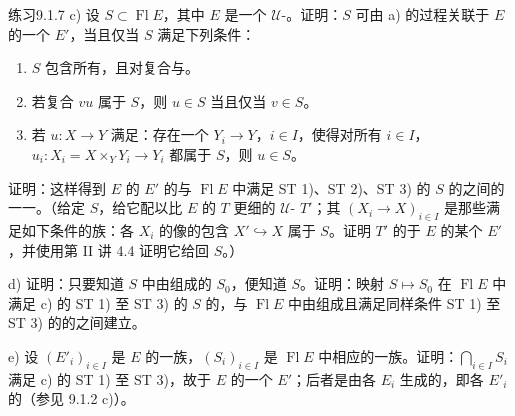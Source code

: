\begin{SGAresult}{练习}{9.1.7}
c) 设 $S\subset\operatorname{Fl}E$，其中 $E$ 是一个 $\mathcal U$-。证明：$S$ 可由 a) 的过程关联于 $E$ 的一个 $E'$，当且仅当 $S$ 满足下列条件：
\begin{enumerate}[label={ST \arabic*)}]
\item $S$ 包含所有，且对复合与。
\item 若复合 $vu$ 属于 $S$，则 $u\in S$ 当且仅当 $v\in S$。
\item 若 $u:X\to Y$ 满足：存在一个 $Y_i\to Y$，$i\in I$，使得对所有 $i\in I$，$u_i:X_i=X\times_Y Y_i\to Y_i$ 都属于 $S$，则 $u\in S$。
\end{enumerate}
证明：这样得到 $E$ 的 $E'$ 的与 $\operatorname{Fl}E$ 中满足 ST 1)、ST 2)、ST 3) 的 $S$ 的之间的一一。（给定 $S$，给它配以比 $E$ 的 $T$ 更细的 $\mathcal U$- $T'$；其 $(X_i\to X)_{i\in I}$ 是那些满足如下条件的族：各 $X_i$ 的像的包含 $X'\hookrightarrow X$ 属于 $S$。证明 $T'$ 的于 $E$ 的某个 $E'$，并使用第 II 讲 4.4 证明它给回 $S$。）

d) 证明：只要知道 $S$ 中由组成的 $S_0$，便知道 $S$。证明：映射 $S\mapsto S_0$ 在 $\operatorname{Fl}E$ 中满足 c) 的 ST 1) 至 ST 3) 的 $S$ 的，与 $\operatorname{Fl}E$ 中由组成且满足同样条件 ST 1) 至 ST 3) 的的之间建立。

e) 设 $(E'_i)_{i\in I}$ 是 $E$ 的一族，$(S_i)_{i\in I}$ 是 $\operatorname{Fl}E$ 中相应的一族。证明：$\bigcap_{i\in I}S_i$ 满足 c) 的 ST 1) 至 ST 3)，故于 $E$ 的一个 $E'$；后者是由各 $E_i$ 生成的，即各 $E'_i$ 的（参见 9.1.2 c)）。


\end{SGAresult}
